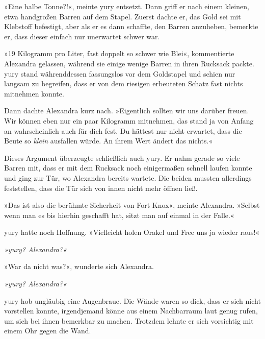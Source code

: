 »Eine halbe Tonne?!«, meinte yury entsetzt. Dann griff er nach einem kleinen, etwa handgroßen Barren auf dem Stapel. Zuerst dachte er, das Gold sei mit Klebstoff befestigt, aber als er es dann schaffte, den Barren anzuheben, bemerkte er, dass dieser einfach nur unerwartet schwer war.

»19 Kilogramm pro Liter, fast doppelt so schwer wie Blei«, kommentierte Alexandra gelassen, während sie einige wenige Barren in ihren Rucksack packte. yury stand währenddessen fassungslos vor dem Goldstapel und schien nur langsam zu begreifen, dass er von dem riesigen erbeuteten Schatz fast nichts mitnehmen konnte.

Dann dachte Alexandra kurz nach. »Eigentlich sollten wir uns darüber freuen. Wir können eben nur ein paar Kilogramm mitnehmen, das stand ja von Anfang an wahrscheinlich auch für dich fest. Du hättest nur nicht erwartet, dass die Beute so \textit{klein} ausfallen würde. An ihrem Wert ändert das nichts.«

Dieses Argument überzeugte schließlich auch yury. Er nahm gerade so viele Barren mit, dass er mit dem Rucksack noch einigermaßen schnell laufen konnte und ging zur Tür, wo Alexandra bereits wartete. Die beiden mussten allerdings feststellen, dass die Tür sich von innen nicht mehr öffnen ließ.

»Das ist also die berühmte Sicherheit von Fort Knox«, meinte Alexandra. »Selbst wenn man es bis hierhin geschafft hat, sitzt man auf einmal in der Falle.«

yury hatte noch Hoffnung. »Vielleicht holen Orakel und Free uns ja wieder raus!«

    \begin{tiny} %

\textit{»yury? Alexandra?«}

    \end{tiny}

»War da nicht was?«, wunderte sich Alexandra.

    \begin{scriptsize}

\textit{»yury? Alexandra?«}

    \end{scriptsize}

yury hob ungläubig eine Augenbraue. Die Wände waren so dick, dass er sich nicht vorstellen konnte, irgendjemand könne aus einem Nachbarraum laut genug rufen, um sich bei ihnen bemerkbar zu machen. Trotzdem lehnte er sich vorsichtig mit einem Ohr gegen die Wand.

